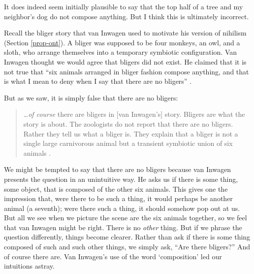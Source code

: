 \documentclass[12pt,twoside]{reedfancy}
\begin{document}
\begin{spacing}{1.25}
It does indeed seem initially plausible to say that the top half of a
tree and my neighbor's dog do not compose anything.  But I think this
is ultimately incorrect.

Recall the bliger story that van Inwagen used to motivate his version
of nihilism (Section \ref{prop-ont}).  A bliger was supposed to be
four monkeys, an owl, and a sloth, who arrange themselves into a
temporary symbiotic configuration.  Van Inwagen thought we would agree
that bligers did not exist.  He claimed that it is not true that ``six
animals arranged in bliger fashion compose anything, and that is what
I mean to deny when I say that there are no bligers''
\citeyearpar[104]{inwagen1995}.

But as we saw, it is simply false that there are no bligers:

\begin{quote}
\ldots {\em of course} there are bligers in [van Inwagen's] story.
Bligers are what the story is about.  The zoologists do not report
that there are no bligers.  Rather they tell us what a bliger is.
They explain that a bliger is not a single large carnivorous animal
but a transient symbiotic union of six animals
\citep[704]{rosenberg1993}.
\end{quote}

We might be tempted to say that there are no bligers because van
Inwagen presents the question in an unintuitive way.  He asks us if
there is some thing, some object, that is composed of the other six
animals.  This gives one the impression that, were there to be such a
thing, it would perhaps be another animal (a seventh); were there such
a thing, it should somehow pop out at us.  But all we see when we
picture the scene are the six animals together, so we feel that van
Inwagen might be right.  There is no {\em other} thing.  But if we
phrase the question differently, things become clearer.  Rather than
ask if there is some thing composed of such and such other things, we
simply ask, ``Are there bligers?''  And of course there are.  Van
Inwagen's use of the word `composition' led our intuitions astray.


\end{spacing}
\end{document}
